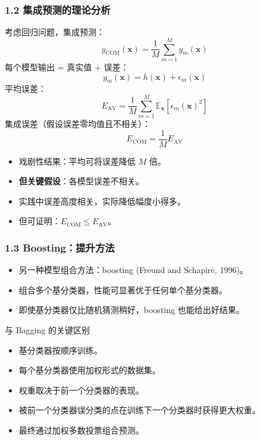 \documentclass[t,aspectratio=169]{beamer} %
\begin{document}
\begin{frame}[allowframebreaks]
    \frametitle{1.2 集成预测的理论分析}
    考虑回归问题，集成预测：
    \begin{equation}
        y_{\text{COM}}(\mathbf{x}) = \frac{1}{M} \sum_{m=1}^{M} y_m(\mathbf{x})
        \tag{9.43}
    \end{equation}
    每个模型输出 = 真实值 + 误差：
    \begin{equation}
        y_m(\mathbf{x}) = h(\mathbf{x}) + \epsilon_m(\mathbf{x})
        \tag{9.44}
    \end{equation}
    平均误差：
    \begin{equation}
        E_{\text{AV}} = \frac{1}{M} \sum_{m=1}^{M} \mathbb{E}_{\mathbf{x}} \left[ \epsilon_m(\mathbf{x})^2 \right]
        \tag{9.46}
    \end{equation}
    集成误差（假设误差零均值且\alert{不相关}）：
    \begin{equation}
        E_{\text{COM}} = \frac{1}{M} E_{\text{AV}}
        \tag{9.50}
    \end{equation}
    \begin{itemize}
        \item \alert{戏剧性结果}：平均可将误差降低 $M$ 倍。
        \item \textbf{但关键假设}：各模型误差\alert{不相关}。
        \item 实践中误差高度相关，实际降低幅度小得多。
        \item 但可证明：$E_{\text{COM}} \leq E_{\text{AV}}$。
    \end{itemize}
\end{frame}

\begin{frame}
    \frametitle{1.3 Boosting：提升方法}
    \begin{itemize}
        \item 另一种模型组合方法：\alert{boosting} (Freund and Schapire, 1996)。
        \item 组合多个\alert{基分类器}，性能可显著优于任何单个基分类器。
        \item 即使基分类器仅比随机猜测稍好，boosting 也能给出好结果。
    \end{itemize}
    \begin{block}{与 Bagging 的关键区别}
        \begin{itemize}
            \item 基分类器\alert{按顺序训练}。
            \item 每个基分类器使用\alert{加权形式}的数据集。
            \item 权重取决于\alert{前一个分类器的表现}。
            \item 被前一个分类器\alert{误分类}的点在训练下一个分类器时获得\alert{更大权重}。
            \item 最终通过\alert{加权多数投票}组合预测。
        \end{itemize}
    \end{block}
\end{frame}
\end{document}
